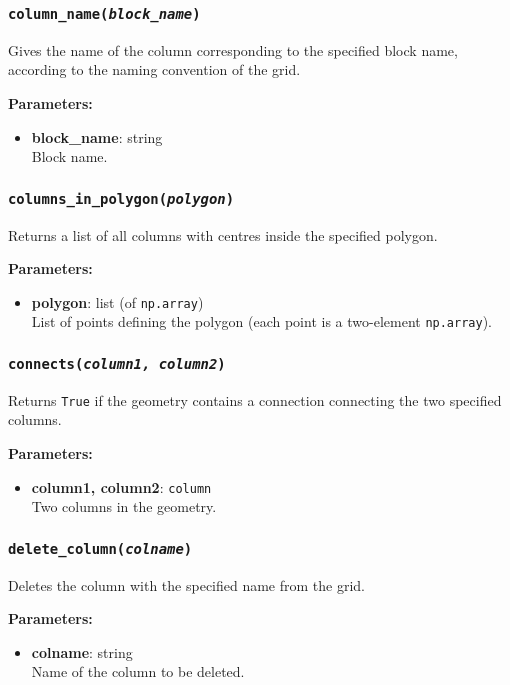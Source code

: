 \subsubsection{\texttt{column\_name(\emph{block\_name})}}

Gives the name of the column corresponding to the specified block name, according to the naming convention of the grid.

\textbf{Parameters:}
\begin{itemize}
\item \textbf{block\_name}: string\\
  Block name.
\end{itemize}

\subsubsection{\texttt{columns\_in\_polygon(\emph{polygon})}}

Returns a list of all columns with centres inside the specified polygon.

\textbf{Parameters:}
\begin{itemize}
\item \textbf{polygon}: list (of \texttt{np.array})\\
  List of points defining the polygon (each point is a two-element \texttt{np.array}).
\end{itemize}

\subsubsection{\texttt{connects(\emph{column1, column2})}}

Returns \texttt{True} if the geometry contains a connection connecting the two specified columns.

\textbf{Parameters:}
\begin{itemize}
\item \textbf{column1, column2}: \texttt{column}\\
  Two columns in the geometry.
\end{itemize}

\subsubsection{\texttt{delete\_column(\emph{colname})}}

Deletes the column with the specified name from the grid.

\textbf{Parameters:}
\begin{itemize}
\item \textbf{colname}: string\\
  Name of the column to be deleted.
\end{itemize}

